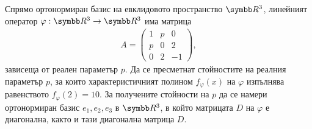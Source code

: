 \documentclass[
  headings=standardclasses,
  bibliography=totocnumbered,
]{scrartcl}
\begin{document}
\begin{exercise}
  Спрямо ортонормиран базис на евклидовото пространство \( \R^3 \), линейният оператор \( \varphi: \R^3 \to \R^3 \) има матрица
  \begin{align*}
    A = \begin{pmatrix}
      1 & p & 0 \\
      p & 0 & 2 \\
      0 & 2 & -1
    \end{pmatrix},
  \end{align*}
  зависеща от реален параметър \( p \). Да се пресметнат стойностите на реалния параметър \( p \), за които характеристичният полином \( f_\varphi(x) \) на \( \varphi \) изпълнява равенството \( f_\varphi(2) = 10 \). За получените стойности на \( p \) да се намери ортонормиран базис \( e_1, e_2, e_3 \) в \( \R^3 \), в който матрицата \( D \) на \( \varphi \) е диагонална, както и тази диагонална матрица \( D \).
\end{exercise}
\end{document}
